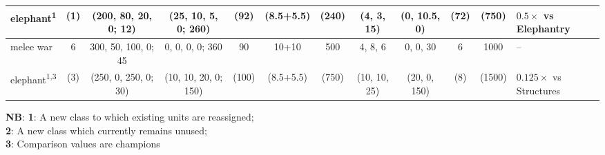 \documentclass{article}
\begin{document}
\begin{landscape}
\begin{tabular}{l|ccc|cccc|ccc|l}
elephant\textsuperscript{1}           & (1) & (200,  80,  20, 0; 12) & (25, 10,  5, 0; 260) &  (92) &  (8.5+5.5)  & (240) &  (4,  3, 15) & (0, 10.5, 0) & (72) &  (750) & $0.5\times$ vs Elephantry\\
\hline
melee war                             &  6  &  300,  50, 100, 0; 45  &  0,  0,  0,  0; 360  &   90  &    10+10    &  500  &   4,  8,  6  &   0,  0, 30  &   6  &  1000  & -- \\
elephant\textsuperscript{1,3}         & (3) & (250,   0, 250, 0; 30) & (10, 10, 20, 0; 150) & (100) &  (8.5+5.5)  & (750) & (10, 10, 25) & (20, 0, 150) &  (8) & (1500) & $0.125\times$ vs Structures\\
\end{tabular}

\textbf{NB}:
\textbf{1}: A new class to which existing units are reassigned;\\
\textbf{2}: A new class which currently remains unused;\\
\textbf{3}: Comparison values are champions %


\clearpage

\end{landscape}
\end{document}
